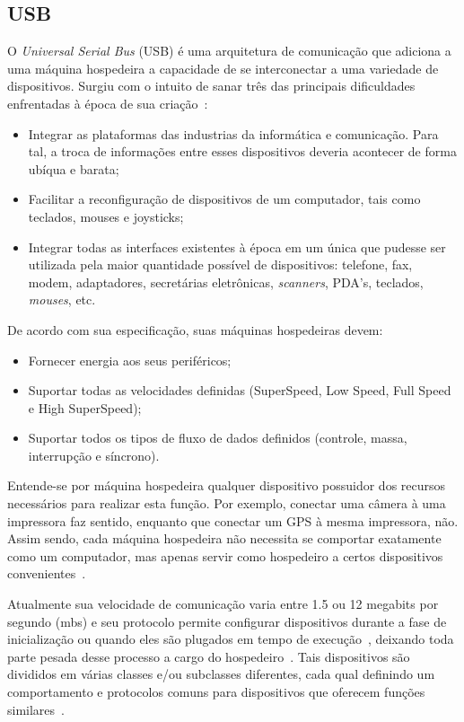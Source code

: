\subsection{USB}

O \emph{Universal Serial Bus} (USB) é uma arquitetura de comunicação que adiciona a uma máquina hospedeira a capacidade de se interconectar a uma variedade de dispositivos. Surgiu com o intuito de sanar três das principais dificuldades enfrentadas à época de sua criação~\cite{usbspec}:

\begin{itemize}
	\item Integrar as plataformas das industrias da informática e comunicação. Para tal, a troca de informações entre esses dispositivos deveria acontecer de forma ubíqua e barata;
	\item Facilitar a reconfiguração de dispositivos de um computador, tais como teclados, mouses e joysticks;
	\item Integrar todas as interfaces existentes à época em um única que pudesse ser utilizada pela maior quantidade possível de dispositivos: telefone, fax, modem, adaptadores, secretárias eletrônicas, \emph{scanners}, PDA's, teclados, \emph{mouses}, etc.
\end{itemize}

De acordo com sua especificação, suas máquinas hospedeiras devem:

\begin{itemize}
	\item Fornecer energia aos seus periféricos;
	\item Suportar todas as velocidades definidas (SuperSpeed, Low Speed, Full Speed e High SuperSpeed);
	\item Suportar todos os tipos de fluxo de dados definidos (controle, massa, interrupção e síncrono).
\end{itemize}

Entende-se por máquina hospedeira qualquer dispositivo possuidor dos recursos necessários para realizar esta função. Por exemplo, conectar uma câmera à uma impressora faz sentido, enquanto que conectar um GPS à mesma impressora, não. Assim sendo, cada máquina hospedeira não necessita se comportar exatamente como um computador, mas apenas servir como hospedeiro a certos dispositivos convenientes~\cite{usb3spec}.

Atualmente sua velocidade de comunicação varia entre 1.5 ou 12 megabits por segundo (mbs) e seu protocolo permite configurar dispositivos durante a fase de inicialização ou quando eles são plugados em tempo de execução~\cite{hid}, deixando toda parte pesada desse processo a cargo do hospedeiro~\cite{usb3spec}. Tais dispositivos são divididos em várias classes e/ou subclasses diferentes, cada qual definindo um comportamento e protocolos comuns para dispositivos que oferecem funções similares~\cite{hid}.

